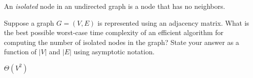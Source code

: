 \begin{prob}
    An \textit{isolated} node in an undirected graph is a node that has no
    neighbors.

    Suppose a graph $G = (V, E)$ is represented using an adjacency matrix. What
    is the best possible worst-case time complexity of an efficient algorithm
    for computing the number of isolated nodes in the graph? State your answer
    as a function of $|V|$ and $|E|$ using asymptotic notation.

    \begin{soln}
        $\Theta(V^2)$
    \end{soln}

\end{prob}
